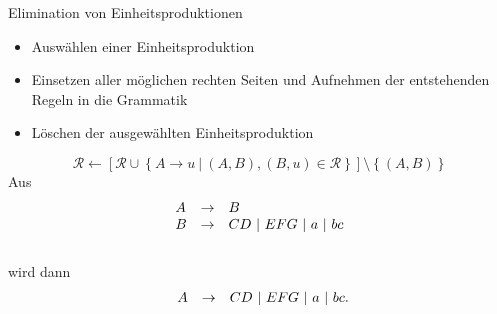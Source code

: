 \documentclass[]{beamer}
\begin{document}
\begin{frame}[squeeze]{}
  \begin{block}{Elimination von Einheitsproduktionen}
    \begin{itemize}
      \item Auswählen einer Einheitsproduktion
      \item Einsetzen aller möglichen rechten Seiten und Aufnehmen der entstehenden Regeln in die Grammatik
      \item Löschen der ausgewählten Einheitsproduktion
    \end{itemize}
    \[\mathcal{R} \leftarrow \left[ \mathcal{R} \cup \left\{ A \to u \ | \ \left(A, B \right), \left( B, u \right) \in \mathcal{R} \right\} \right] \setminus \left\{ \left( A, B \right) \right\} \]
    \pause
    Aus
    \[\begin{array}{l c l}
        A & \rightarrow & B \\
        B & \rightarrow & CD \ | \ EFG \ | \ a \ | \ bc \\
      \end{array}\] \\
    \vspace*{-0.75em}
    wird dann
    \[\begin{array}{l c l}
        \hspace*{0.45em} A & \rightarrow & CD \ | \ EFG \ | \ a \ | \ bc. \\
      \end{array}\] \\
  \end{block}
\end{frame}
\end{document}
